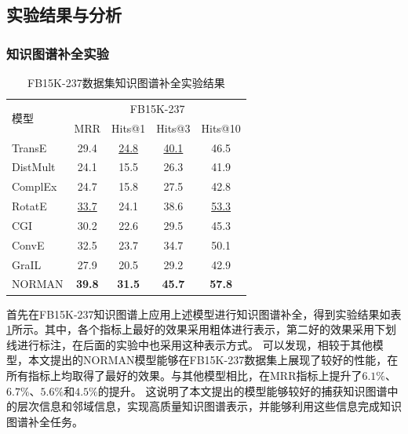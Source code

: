 \documentclass[algorithmlist, AutoFakeBold, AutoFakeSlant, figurelist, tablelist, nomlist, engineering]{seuthesix}
\begin{document}
\subsection{实验结果与分析}
\subsubsection{知识图谱补全实验}
\begin{table}[t]
  \centering
  \caption{FB15K-237数据集知识图谱补全实验结果}
  \begin{tabular*}{0.95\textwidth}{@{\extracolsep{\fill}}lcccc}
    \toprule[1pt]
    \multirow{2}{*}{模型} & \multicolumn{4}{c}{FB15K-237} \\
      & MRR & Hits@1 & Hits@3 & Hits@10 \\ \hline
    TransE & 29.4 & \underline{24.8} & \underline{40.1} & 46.5 \\
    DistMult & 24.1 & 15.5 & 26.3 & 41.9 \\
    ComplEx & 24.7 & 15.8 & 27.5 & 42.8 \\
    RotatE & \underline{33.7} & 24.1 & 38.6  & \underline{53.3} \\
    CGI & 30.2 & 22.6 & 29.5 & 45.3 \\
    ConvE & 32.5 & 23.7 & 34.7 & 50.1 \\
    GraIL & 27.9 & 20.5 & 29.2 & 42.9 \\
    NORMAN & \textbf{39.8} & \textbf{31.5} & \textbf{45.7} & \textbf{57.8} \\
    \bottomrule[1pt]
  \end{tabular*}
  \label{Experiment1_FB15K-237}
\end{table}

首先在FB15K-237知识图谱上应用上述模型进行知识图谱补全，得到实验结果如表\ref{Experiment1_FB15K-237}所示。其中，各个指标上最好的效果采用粗体进行表示，第二好的效果采用下划线进行标注，在后面的实验中也采用这种表示方式。
可以发现，相较于其他模型，本文提出的NORMAN模型能够在FB15K-237数据集上展现了较好的性能，在所有指标上均取得了最好的效果。与其他模型相比，在MRR指标上提升了$6.1\%$、$6.7\%$、$5.6\%$和$4.5\%$的提升。
这说明了本文提出的模型能够较好的捕获知识图谱中的层次信息和邻域信息，实现高质量知识图谱表示，并能够利用这些信息完成知识图谱补全任务。
\end{document}
